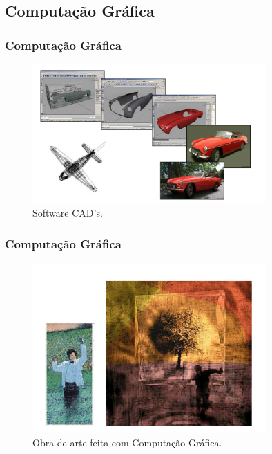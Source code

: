 \documentclass{beamer}
\begin{document}
\subsection{Computação Gráfica}
\begin{frame}
\frametitle{Computação Gráfica}

	\begin{figure}[!h]
		\begin{center}
			\includegraphics[width=0.8\textwidth]{Figures/cad}
			\caption{Software CAD's.}
		\end{center}
		
	\end{figure}

\end{frame}



\begin{frame}
\frametitle{Computação Gráfica}

	\begin{figure}[!h]
		\begin{center}
			\includegraphics[width=0.8\textwidth]{Figures/arte}
			\caption{Obra de arte feita com Computação Gráfica.}
		\end{center}
		
	\end{figure}

\end{frame}
\end{document}
